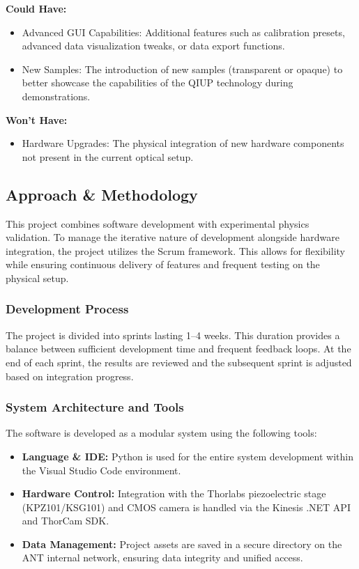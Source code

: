 \documentclass[12pt,a4paper]{article}
\begin{document}
    \textbf{Could Have:}
    \begin{itemize}
        \item Advanced \ac{GUI} Capabilities: Additional features such as calibration presets, advanced data visualization tweaks, or data export functions.
        \item New Samples: The introduction of new samples (transparent or opaque) to better showcase the capabilities of the \ac{QIUP} technology during demonstrations. 
    \end{itemize}

    \textbf{Won't Have:}
    \begin{itemize}
        \item Hardware Upgrades: The physical integration of new hardware components not present in the current optical setup.
    \end{itemize}

\subsection{Approach \& Methodology}

    This project combines software development with experimental physics validation. To manage the iterative nature of development alongside hardware integration, the project utilizes the Scrum framework. This allows for flexibility while ensuring continuous delivery of features and frequent testing on the physical setup.

    \subsubsection{Development Process}
    The project is divided into sprints lasting 1--4 weeks. This duration provides a balance between sufficient development time and frequent feedback loops. At the end of each sprint, the results are reviewed and the subsequent sprint is adjusted based on integration progress.

    \subsubsection{System Architecture and Tools}
    The software is developed as a modular system using the following tools:
    \begin{itemize}
        \item \textbf{Language \& IDE:} Python is used for the entire system development within the Visual Studio Code environment.
        \item \textbf{Hardware Control:} Integration with the Thorlabs piezoelectric stage (KPZ101/KSG101) and \ac{CMOS} camera is handled via the Kinesis .NET API and ThorCam SDK.
        \item \textbf{Data Management:} Project assets are saved in a secure directory on the \ac{ANT} internal network, ensuring data integrity and unified access.
    \end{itemize}
\end{document}
